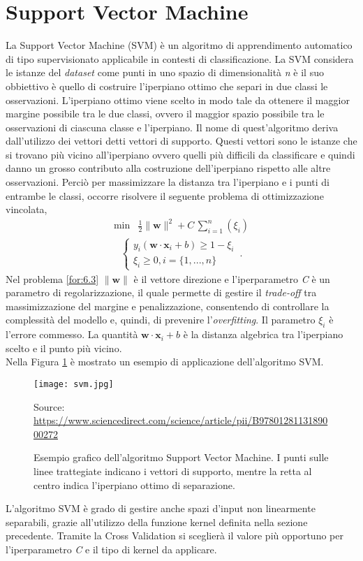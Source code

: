 \section{Support Vector Machine}
La Support Vector Machine (SVM) \autocite{GHOLAMI2017515} è un algoritmo di apprendimento automatico di tipo supervisionato applicabile in contesti di classificazione. La SVM considera le istanze del \emph{dataset} come punti in uno spazio di dimensionalità \emph{n} è il suo obbiettivo è quello di costruire l'iperpiano ottimo che separi in due classi le osservazioni. L'iperpiano ottimo viene scelto in modo tale da ottenere il maggior margine possibile tra le due classi, ovvero il maggior spazio possibile tra le osservazioni di ciascuna classe e l'iperpiano. Il nome di quest'algoritmo deriva dall'utilizzo dei vettori detti vettori di supporto. Questi vettori sono le istanze che si trovano più vicino all'iperpiano ovvero quelli più difficili da classificare e quindi danno un grosso contributo alla costruzione dell'iperpiano rispetto alle altre osservazioni. Perciò per massimizzare la distanza tra l'iperpiano e i punti di entrambe le classi, occorre risolvere il seguente problema di ottimizzazione vincolata, 
\begin{align}
	\text{min} & \frac{1}{2} \|\mathbf{w}\|^2 + C \, \sum_{i=1}^{n} (\xi_i) \label{for:6.3}
\end{align}
\begin{align*} 
	\begin{cases}
		y_i(\mathbf{w \cdot x}_i + b) \geq  1 - \xi_i \\
		\xi_i \geq 0, i=\{1,...,n\}
	\end{cases} \, .
\end{align*}
Nel problema \ref{for:6.3} $\|\mathbf{w}\|$ è il vettore direzione e l'iperparametro \emph{C} è un parametro di regolarizzazione, il quale permette di gestire il \emph{trade-off} tra massimizzazione del margine e penalizzazione, consentendo di controllare la complessità del modello e, quindi, di prevenire l'\emph{overfitting}. Il parametro $\xi_i$ è l'errore commesso. La quantità $\mathbf{w \cdot x}_i + b$ è la distanza algebrica tra l'iperpiano scelto e il punto più vicino.\\
Nella Figura \ref{fig:svm} è mostrato un esempio di applicazione dell'algoritmo SVM.
\begin{figure}[h]
	\begin{center}
		\texttt{[image: svm.jpg]}
		\caption{Esempio grafico dell'algoritmo Support Vector Machine. I punti sulle linee trattegiate indicano i vettori di supporto, mentre la retta al centro indica l'iperpiano ottimo di separazione.
		} 
		Source: \url{https://www.sciencedirect.com/science/article/pii/B9780128113189000272}\label{fig:svm}
	\end{center}
\end{figure}
L'algoritmo SVM è grado di gestire anche spazi d'input non linearmente separabili, grazie all'utilizzo della funzione kernel definita nella sezione precedente. Tramite la Cross Validation si sceglierà il valore più opportuno per l'iperparametro \emph{C} e il tipo di kernel da applicare.

